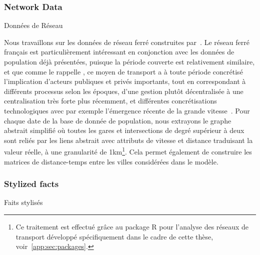 


\subsubsection{Network Data}{Données de Réseau}

Nous travaillons sur les données de réseau ferré construites par~\cite{thevenin2013mapping}. Le réseau ferré français est particulièrement intéressant en conjonction avec les données de population déjà présentées, puisque la période couverte est relativement similaire, et que comme le rappelle \cite{thevenin2013mapping}, ce moyen de transport a à toute période concrétisé l'implication d'acteurs publiques et privés importants, tout en correspondant à différents processus selon les époques, d'une gestion plutôt décentralisée à une centralisation très forte plus récemment, et différentes concrétisations technologiques avec par exemple l'émergence récente de la grande vitesse~\cite{zembri1997fondements}. Pour chaque date de la base de donnée de population, nous extrayons le graphe abstrait simplifié où toutes les gares et intersections de degré supérieur à deux sont reliés par les liens abstrait avec attributs de vitesse et distance traduisant la valeur réelle, à une granularité de 1km\footnote{Ce traitement est effectué grâce au package R pour l'analyse des réseaux de transport développé spécifiquement dans le cadre de cette thèse, voir~\ref{app:sec:packages}.}. Cela permet également de construire les matrices de distance-temps entre les villes considérées dans le modèle.




\subsubsection{Stylized facts}{Faits stylisés}


